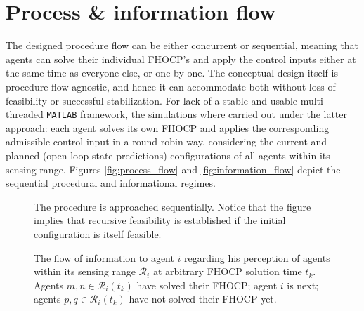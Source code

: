 \section{Process \& information flow}

The designed procedure flow can be either concurrent or sequential, meaning
that agents can solve their individual FHOCP's and apply the control inputs
either at the same time as everyone else, or one by one. The conceptual
design itself is procedure-flow agnostic, and hence it can accommodate both
without loss of feasibility or successful stabilization. For lack of a stable
and usable multi-threaded \texttt{MATLAB} framework, the simulations where
carried out under the latter approach: each agent solves its own FHOCP and
applies the corresponding admissible control input in a round robin way,
considering the current and planned (open-loop state predictions) configurations
of all agents within its sensing range. Figures \eqref{fig:process_flow}
and \eqref{fig:information_flow} depict the sequential procedural and
informational regimes.\\[2ex]

\begin{figure}[ht]\centering
  \scalebox{0.9}{}
  \caption{The procedure is approached sequentially. Notice that the
    figure implies that recursive feasibility is established if the initial
    configuration is itself feasible.}
  \label{fig:process_flow}
\end{figure}

\begin{figure}[ht]\centering
  \scalebox{0.9}{}
  \caption{The flow of information to agent $i$ regarding his perception of
    agents within its sensing range $\mathcal{R}_i$ at arbitrary FHOCP
    solution time $t_k$. Agents $m,n \in \mathcal{R}_i(t_k)$ have solved their
    FHOCP; agent $i$ is next; agents $p,q \in \mathcal{R}_i(t_k)$ have not
    solved their FHOCP yet.}
  \label{fig:information_flow}
\end{figure}

